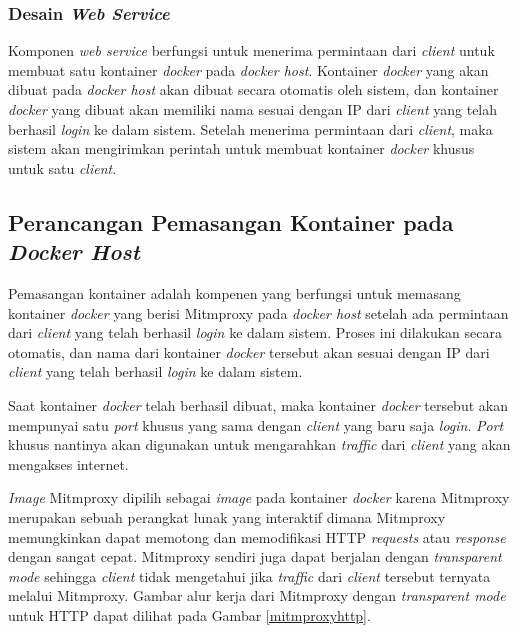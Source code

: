 \subsubsection{Desain \textit{Web Service}}
Komponen \textit{web service} berfungsi untuk menerima permintaan dari \textit{client} untuk membuat satu kontainer \textit{docker} pada \textit{docker host}. Kontainer \textit{docker} yang akan dibuat pada \textit{docker host} akan dibuat secara otomatis oleh sistem, dan kontainer \textit{docker} yang dibuat akan memiliki nama sesuai dengan IP dari \textit{client} yang telah berhasil \textit{login} ke dalam sistem. Setelah menerima permintaan dari \textit{client}, maka sistem akan mengirimkan perintah untuk membuat kontainer \textit{docker} khusus untuk satu \textit{client}. 

\subsection{Perancangan Pemasangan Kontainer pada \textit{Docker Host}}
Pemasangan kontainer adalah kompenen yang berfungsi untuk memasang kontainer \textit{docker} yang berisi Mitmproxy pada \textit{docker host} setelah ada permintaan dari \textit{client} yang telah berhasil \textit{login} ke dalam sistem. Proses ini dilakukan secara otomatis, dan nama dari kontainer \textit{docker} tersebut akan sesuai dengan IP dari \textit{client} yang telah berhasil \textit{login} ke dalam sistem.

Saat kontainer \textit{docker} telah berhasil dibuat, maka kontainer \textit{docker} tersebut akan mempunyai satu \textit{port} khusus yang sama dengan \textit{client} yang baru saja \textit{login}. \textit{Port} khusus nantinya akan digunakan untuk mengarahkan \textit{traffic} dari \textit{client} yang akan mengakses internet.

\textit{Image} Mitmproxy dipilih sebagai \textit{image} pada kontainer \textit{docker} karena Mitmproxy merupakan sebuah perangkat lunak yang interaktif dimana Mitmproxy memungkinkan dapat memotong dan memodifikasi HTTP \textit{requests} atau \textit{response} dengan sangat cepat. Mitmproxy sendiri juga dapat berjalan dengan \textit{transparent mode} sehingga \textit{client} tidak mengetahui jika \textit{traffic} dari \textit{client} tersebut ternyata melalui Mitmproxy. Gambar alur kerja dari Mitmproxy dengan \textit{transparent mode} untuk HTTP dapat dilihat pada Gambar \ref{mitmproxyhttp}.

